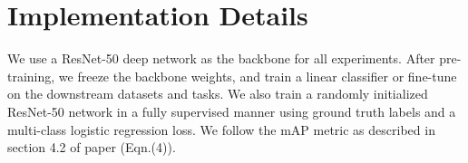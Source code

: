 
   
    
         
        
            
    


\section{Implementation Details}
We use a ResNet-50 \cite{He2015} deep network as the backbone for all experiments. After pre-training, we freeze the backbone weights, and train a linear classifier or fine-tune on the downstream datasets and tasks. We also train a randomly initialized ResNet-50 network in a fully supervised manner using ground truth labels and a multi-class logistic regression loss. We follow the mAP metric as described in section 4.2 of paper \cite{veit2017learning} (Eqn.(4)).

